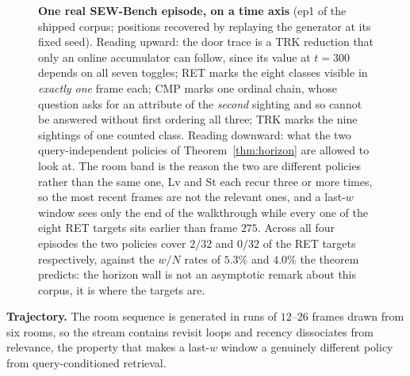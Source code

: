 \documentclass[10pt]{article}
\theoremstyle{definition}
\theoremstyle{plain}
\begin{document}
\begin{figure}[!t]
\caption{\textbf{One real SEW-Bench episode, on a time axis} (ep1 of the shipped corpus;
positions recovered by replaying the generator at its fixed seed). Reading upward: the
\textsf{door} trace is a TRK reduction that only an online accumulator can follow, since its
value at $t{=}300$ depends on all seven toggles; \textsf{RET} marks the eight classes visible in
\emph{exactly one} frame each; \textsf{CMP} marks one ordinal chain, whose question asks for an
attribute of the \emph{second} sighting and so cannot be answered without first ordering all
three; \textsf{TRK} marks the nine sightings of one counted class. Reading downward: what the two
query-independent policies of Theorem~\ref{thm:horizon} are allowed to look at. The room band
is the reason the two are different policies rather than the same one, \textsf{Lv} and
\textsf{St} each recur three or more times, so the most recent frames are not the relevant ones,
and a last-$w$ window sees only the end of the walkthrough while every one of the eight RET
targets sits earlier than frame $275$. Across all four episodes the two policies cover $2/32$ and $0/32$ of the RET
targets respectively, against the $w/N$ rates of $5.3\%$ and $4.0\%$ the theorem predicts: the
horizon wall is not an asymptotic remark about this corpus, it is where the targets are.}
\label{fig:timeline}
\end{figure}

\textbf{Trajectory.} The room sequence is generated in runs of $12$--$26$ frames drawn from six rooms, so the stream contains revisit loops and recency dissociates from relevance, the property that makes a last-$w$ window a genuinely different policy from query-conditioned retrieval.
\end{document}
